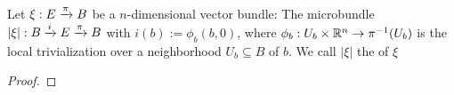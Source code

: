 \\ Let $\xi: E \xto{\pi} B$ be a $n$-dimensional vector bundle:
The microbundle $\lvert \xi \rvert: \bundle{B}{E}{i}{\pi}$ with $i(b) := \phi_b(b, 0)$, where
$\phi_b: U_b \times \R^n \to \pi^{-1}(U_b)$ is the local trivialization over a
neighborhood $U_b \subseteq B$ of $b$. We call $\lvert \xi \rvert$ the  of $\xi$
\begin{proof}
    
\end{proof}